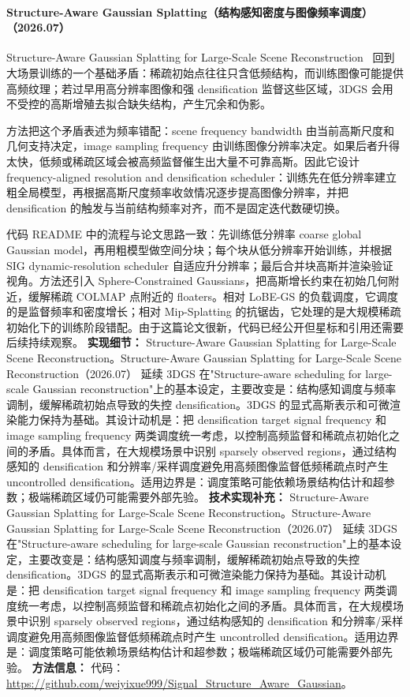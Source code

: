 \paragraph{Structure-Aware Gaussian Splatting（结构感知密度与图像频率调度）（2026.07）}
Structure-Aware Gaussian Splatting for Large-Scale Scene Reconstruction~\cite{2607_01698} 回到大场景训练的一个基础矛盾：稀疏初始点往往只含低频结构，而训练图像可能提供高频纹理；若过早用高分辨率图像和强 densification 监督这些区域，3DGS 会用不受控的高斯增殖去拟合缺失结构，产生冗余和伪影。

方法把这个矛盾表述为频率错配：scene frequency bandwidth 由当前高斯尺度和几何支持决定，image sampling frequency 由训练图像分辨率决定。如果后者升得太快，低频或稀疏区域会被高频监督催生出大量不可靠高斯。因此它设计 frequency-aligned resolution and densification scheduler：训练先在低分辨率建立粗全局模型，再根据高斯尺度频率收敛情况逐步提高图像分辨率，并把 densification 的触发与当前结构频率对齐，而不是固定迭代数硬切换。

代码 README 中的流程与论文思路一致：先训练低分辨率 coarse global Gaussian model，再用粗模型做空间分块；每个块从低分辨率开始训练，并根据 SIG dynamic-resolution scheduler 自适应升分辨率；最后合并块高斯并渲染验证视角。方法还引入 Sphere-Constrained Gaussians，把高斯增长约束在初始几何附近，缓解稀疏 COLMAP 点附近的 floaters。相对 LoBE-GS 的负载调度，它调度的是监督频率和密度增长；相对 Mip-Splatting 的抗锯齿，它处理的是大规模稀疏初始化下的训练阶段错配。由于这篇论文很新，代码已经公开但星标和引用还需要后续持续观察。
\textbf{实现细节：} Structure-Aware Gaussian Splatting for Large-Scale Scene Reconstruction。Structure-Aware Gaussian Splatting for Large-Scale Scene Reconstruction（2026.07） 延续 3DGS 在"Structure-aware scheduling for large-scale Gaussian reconstruction"上的基本设定，主要改变是：结构感知调度与频率调制，缓解稀疏初始点导致的失控 densification。3DGS 的显式高斯表示和可微渲染能力保持为基础。其设计动机是：把 densification target signal frequency 和 image sampling frequency 两类调度统一考虑，以控制高频监督和稀疏点初始化之间的矛盾。具体而言，在大规模场景中识别 sparsely observed regions，通过结构感知的 densification 和分辨率/采样调度避免用高频图像监督低频稀疏点时产生 uncontrolled densification。适用边界是：调度策略可能依赖场景结构估计和超参数；极端稀疏区域仍可能需要外部先验。
\textbf{技术实现补充：} Structure-Aware Gaussian Splatting for Large-Scale Scene Reconstruction。Structure-Aware Gaussian Splatting for Large-Scale Scene Reconstruction（2026.07） 延续 3DGS 在"Structure-aware scheduling for large-scale Gaussian reconstruction"上的基本设定，主要改变是：结构感知调度与频率调制，缓解稀疏初始点导致的失控 densification。3DGS 的显式高斯表示和可微渲染能力保持为基础。其设计动机是：把 densification target signal frequency 和 image sampling frequency 两类调度统一考虑，以控制高频监督和稀疏点初始化之间的矛盾。具体而言，在大规模场景中识别 sparsely observed regions，通过结构感知的 densification 和分辨率/采样调度避免用高频图像监督低频稀疏点时产生 uncontrolled densification。适用边界是：调度策略可能依赖场景结构估计和超参数；极端稀疏区域仍可能需要外部先验。
\textbf{方法信息：} 代码：\url{https://github.com/weiyixue999/Signal_Structure_Aware_Gaussian}。

